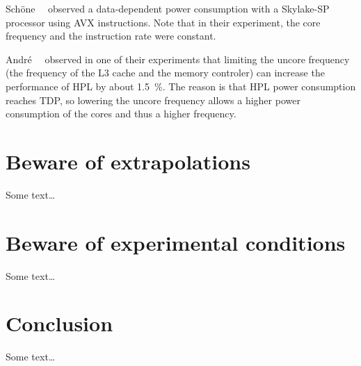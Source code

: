             Sch{\"{o}}ne~\etal~\cite{DBLP:journals/corr/abs-1905-12468} observed a data-dependent power consumption with
            a Skylake-SP processor using AVX instructions. Note that in their experiment, the core frequency and the
            instruction rate were constant.

            Andr\'e~\etal~\cite{andre:hal-02401796} observed in one of their experiments that limiting the uncore
            frequency (\ie the frequency of the L3 cache and the memory controler) can increase the performance of HPL
            by about \SI{1.5}{\percent}. The reason is that HPL power consumption reaches TDP, so lowering the uncore
            frequency allows a higher power consumption of the cores and thus a higher frequency.

    \section{Beware of extrapolations}%
    \label{sec:beware_of_extrapolations}
        Some text\dots

    \section{Beware of experimental conditions}%
    \label{sec:beware_of_experimental_conditions}
        Some text\dots

	\section{Conclusion}
        Some text\dots


